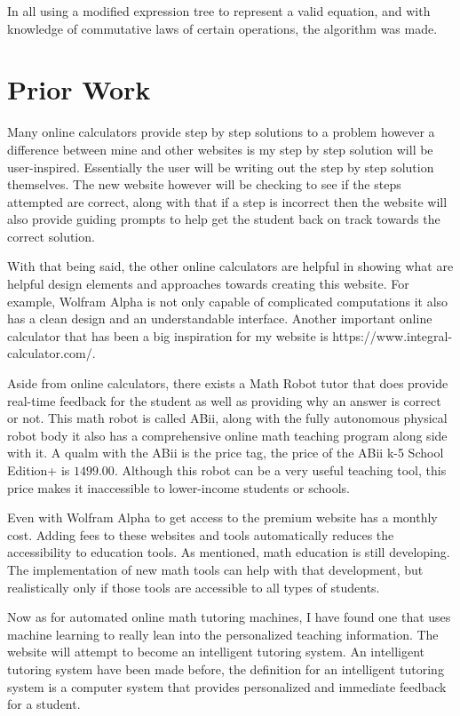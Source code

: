 \documentclass[10pt,twocolumn]{article}
\begin{document}
In all using a modified expression tree to represent a valid equation, and with knowledge of  commutative laws of certain operations, the algorithm was made. 
\section{Prior Work}
Many online calculators provide step by step solutions to a problem however a difference between mine and other websites is my step by step solution will be user-inspired. Essentially the user will be writing out the step by step solution themselves. The new website however will be checking to see if the steps attempted are correct, along with that if a step is incorrect then the website will also provide guiding prompts to help get the student back on track towards the correct solution. 

With that being said, the other online calculators are helpful in showing what are helpful design elements and approaches towards creating this website. For example, Wolfram Alpha is not only capable of complicated computations it also has a clean design and an understandable interface. Another important online calculator that has been a big inspiration for my website is https://www.integral-calculator.com/. 

Aside from online calculators, there exists a Math Robot tutor that does provide real-time feedback for the student as well as providing why an answer is correct or not. This math robot is called ABii, along with the fully autonomous physical robot body it also has a comprehensive online math teaching program along side with it. A qualm with the ABii is  the price tag, the price of the ABii k-5 School Edition+ is $1499.00$. Although this robot can be a very useful teaching tool, this price makes it inaccessible to lower-income students or schools. 

Even with Wolfram Alpha to get access to the premium website has a monthly cost. Adding fees to these websites and tools automatically reduces the accessibility to education tools. As mentioned, math education is still developing. The implementation of new math tools can help with that development, but realistically only if those tools are accessible to all types of students. 

Now as for automated online math tutoring machines, I have found one that uses machine learning to really lean into the personalized teaching information. The website will attempt to become an intelligent tutoring system. An intelligent tutoring system have been made before, the definition for an intelligent tutoring system is a computer system that provides personalized and immediate feedback for a student.  
\end{document}
